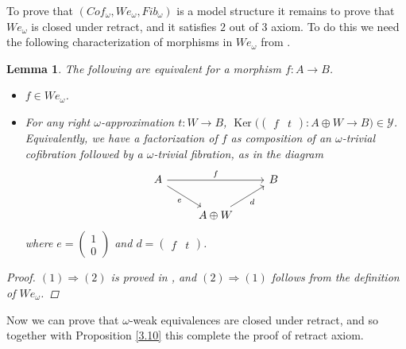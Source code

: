 \documentclass[12pt]{amsart}
\numberwithin{equation}{section}
\newtheorem{lemma}{Lemma}[section]
\theoremstyle{definition}
\DeclareMathOperator{\Ker}{Ker}
\newtheorem*{theorem 0*}{Theorem}
\newtheorem*{theorem a*}{Theorem A}
\newtheorem*{theorem b*}{Theorem B}
\newcounter{diagram}
\numberwithin{diagram}{section}
\begin{document}
To prove that $(Cof_{\omega},We_{\omega},Fib_{\omega})$ is a model structure it remains to prove that $We_{\omega}$ is closed under retract, and it satisfies $2$ out of $3$ axiom. To do this we need the following characterization of morphisms in $We_{\omega}$ from \cite{CLZ}.

\begin{lemma}\label{3.13}
The following are equivalent for a morphism $f:A\rightarrow B$.
\begin{itemize}
\item[(1)]
$f\in We_{\omega}$.
\item[(2)]
For any right $\omega$-approximation $t:W\rightarrow B$, $\Ker\big(\begin{pmatrix}f&t\end{pmatrix}:A\oplus W\rightarrow B\big)\in \mathcal{Y}$. Equivalently, we have a factorization of $f$ as composition of an $\omega$-trivial cofibration followed by a $\omega$-trivial fibration, as in the diagram
\[\begin{tikzcd}
	A && B \\
	& {A\oplus W}
	\arrow["f", from=1-1, to=1-3]
	\arrow["e"', from=1-1, to=2-2]
	\arrow["d"', from=2-2, to=1-3]
\end{tikzcd}\]
where $e=\begin{pmatrix}
    1\\
    0
\end{pmatrix}$ and $d=\begin{pmatrix}
    f&t
\end{pmatrix}$.
\end{itemize}
\begin{proof}
   $(1)\Rightarrow (2)$ is proved in \cite[Lemma 3.6]{CLZ}, and $(2)\Rightarrow (1)$ follows from the definition of $We_{\omega}$.
\end{proof}
\end{lemma}

Now we can prove that $\omega$-weak equivalences are closed under retract, and so together with Proposition \ref{3.10} this complete the proof of retract axiom.
\end{document}
